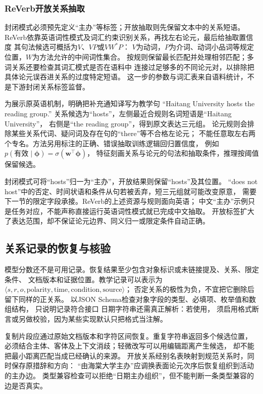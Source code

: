 \subsubsection{ReVerb开放关系抽取}
\label{sec:nlp-extraction-reverb}

封闭模式必须预先定义“主办”等标签；开放抽取则先保留文本中的关系短语。
ReVerb依靠英语词性模式及词汇约束识别关系，再找左右论元，最后给抽取置信度
其句法候选可概括为$V$、$VP$或$VW^{*}P$：
$V$为动词，$P$为介词、动词小品词等规定位置，$W$为方法允许的中间词性集合。
按规则保留最长匹配并处理相邻匹配；多词关系还要检查其词汇模式是否在语料中
连接过足够多的不同论元对，以排除把具体论元误吞进关系的过度特定短语。
这一步的参数与词汇表来自语料统计，不是下游封闭关系标签监督。

为展示原英语机制，明确把补充通知译写为教学句
“Haitang University hosts the reading group.”
关系候选为“hosts”，左侧最近合规则名词短语是“Haitang University”，
右侧是“the reading group”，得到原文表达三元组。
论元规则会排除某些关系代词、疑问词及存在句的“there”等不合格左论元；
不能任意取左右两个专名。方法另用标注的正确、错误抽取训练逻辑回归置信度，
例如$p(\text{有效}\mid\bm{\phi})=\sigma(\bm{w}^{\top}\bm{\phi})$，
特征刻画关系与论元的句法和抽取条件，推理按阈值保留候选。

封闭模式可将“hosts”归一为“主办”，开放结果则保留“hosts”及其位置。
“does not host”中的否定、时间状语和条件从句若被丢弃，短三元组就可能改变原意，
需要下一节的限定字段承接。ReVerb的上述资源与规则面向英语；
中文“主办”示例只是任务对应，不能声称直接运行英语词性模式就已完成中文抽取。
开放标签扩大了表达范围，却不保证论元边界、同义归一或限定条件自动正确。

\subsection{关系记录的恢复与核验}
\label{sec:nlp-extraction-relation-records}

模型分数还不是可用记录。恢复结果至少包含对象标识或未链接提及、关系、限定条件、
文档版本和证据位置。教学记录可以表示为
$\langle s,r,o,\text{polarity},\text{time},\text{condition},\text{source}\rangle$；
否定关系的极性为负，不宜把它删除后留下同样的正关系。
以JSON Schema检查对象字段的类型、必填项、枚举值和数组结构，
只说明记录符合接口
日期字符串还需真正解析：若使用，
须启用格式断言或另做校验，因为某些实现默认只把格式当注解。

复制片段应通过原始文档版本和字符区间恢复。重复字符串返回多个候选位置，
必须结合主体、客体及上下文消歧；轻微改写可以用编辑距离产生候选，
却不能把最小距离匹配当成已经确认的来源。
开放关系经别名表映射到规范关系时，同时保存原措辞和方向：
“由海棠大学主办”应调换表面论元次序后恢复组织到活动的主办边。
类型兼容检查可以拒绝“日期主办组织”，但不能判断一条类型兼容的边是否真实。

